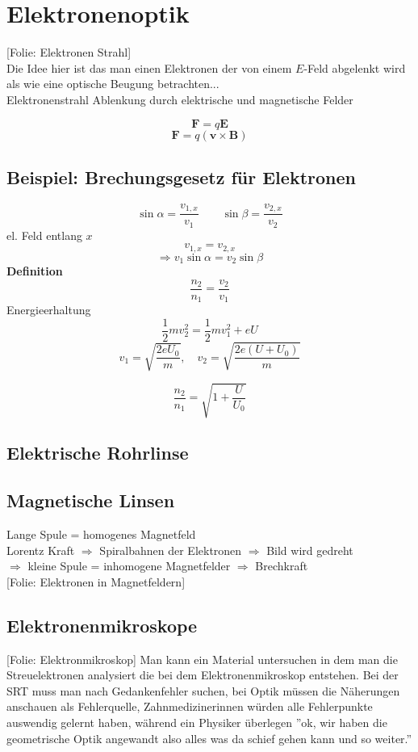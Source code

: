 \documentclass[titlepage,11pt,a4paper,ngerman]{report}
\newcommand{\folie}[1]{\color{gray}[Folie: #1]\color{black}}
\renewcommand{\vec}[1]{\boldsymbol{#1}}
\newcommand{\lcom}[1]{\color{MidnightBlue}#1\color{black}}
\newcommand{\frbox}[2]{\begin{tcolorbox}[colback=white,colframe=red!75!black,fonttitle=\bfseries,title=#1]#2\end{tcolorbox}}
\begin{document}

\section{Elektronenoptik}

\folie{Elektronen Strahl}\\
\lcom{Die Idee hier ist das man einen Elektronen der von einem $E$-Feld abgelenkt wird als wie eine optische Beugung betrachten...}\\
Elektronenstrahl Ablenkung durch elektrische und magnetische Felder

$$\vec{F} = q \vec{E}$$
$$\vec{F} = q (\vec{v} \times \vec{B})$$
\subsection{Beispiel: Brechungsgesetz für Elektronen}

$$\sin \alpha = \frac{v_{1,x}}{v_1} \qquad \sin \beta = \frac{v_{2,x}}{v_2}$$
el. Feld entlang $x$
$$v_{1,x} = v_{2,x}$$
$$\Rightarrow v_1 \sin \alpha = v_2 \sin \beta$$
\textbf{Definition}
$$\frac{n_2}{n_1} = \frac{v_2}{v_1}$$
Energieerhaltung
$$\frac{1}{2} mv^2_2 = \frac{1}{2} mv_1^2 + eU$$
$$v_1 = \sqrt{\frac{2eU_0}{m}}, \quad v_2 = \sqrt{\frac{2e(U+U_0)}{m}}$$
\frbox{$\Rightarrow$ Brechindex}{$$\frac{n_2}{n_1} = \sqrt{1 + \frac{U}{U_0}}$$}

\subsection{Elektrische Rohrlinse}
\subsection{Magnetische Linsen}

Lange Spule = homogenes Magnetfeld\\
Lorentz Kraft $\Rightarrow$ Spiralbahnen der Elektronen $\Rightarrow$ Bild wird gedreht\\
$\Rightarrow$ kleine Spule = inhomogene Magnetfelder $\Rightarrow$ Brechkraft \\






\folie{Elektronen in Magnetfeldern}
\subsection{Elektronenmikroskope}
\folie{Elektronmikroskop}
\lcom{Man kann ein Material untersuchen in dem man die Streuelektronen analysiert die bei dem Elektronenmikroskop entstehen.}
\lcom{Bei der SRT muss man nach Gedankenfehler suchen, bei Optik müssen die Näherungen anschauen als Fehlerquelle, Zahnmedizinerinnen würden alle Fehlerpunkte auswendig gelernt haben, während ein Physiker überlegen ''ok, wir haben die geometrische Optik angewandt also alles was da schief gehen kann und so weiter.''}
\end{document}
